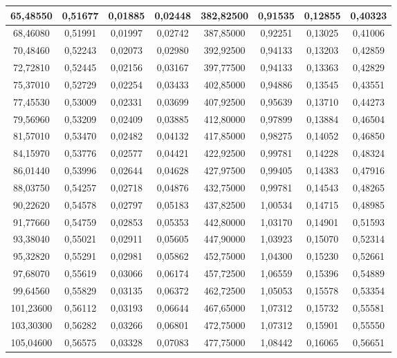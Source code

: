\documentclass[a4paper,12pt]{article}
\numberwithin{equation}{section}
\begin{document}
\begin{appendices}
\begin{longtable}[c]{|c|c|c|c|c|c|c|c|}
65,48550	&	0,51677	&	0,01885	&	0,02448	&	382,82500	&	0,91535	&	0,12855	&	0,40323	\\\hline
68,46080	&	0,51991	&	0,01997	&	0,02742	&	387,85000	&	0,92251	&	0,13025	&	0,41006	\\\hline
70,48460	&	0,52243	&	0,02073	&	0,02980	&	392,92500	&	0,94133	&	0,13203	&	0,42859	\\\hline
72,72810	&	0,52445	&	0,02156	&	0,03167	&	397,77500	&	0,94133	&	0,13363	&	0,42829	\\\hline
75,37010	&	0,52729	&	0,02254	&	0,03433	&	402,85000	&	0,94886	&	0,13545	&	0,43551	\\\hline
77,45530	&	0,53009	&	0,02331	&	0,03699	&	407,92500	&	0,95639	&	0,13710	&	0,44273	\\\hline
79,56960	&	0,53209	&	0,02409	&	0,03885	&	412,80000	&	0,97899	&	0,13884	&	0,46504	\\\hline
81,57010	&	0,53470	&	0,02482	&	0,04132	&	417,85000	&	0,98275	&	0,14052	&	0,46850	\\\hline
84,15970	&	0,53776	&	0,02577	&	0,04421	&	422,92500	&	0,99781	&	0,14228	&	0,48324	\\\hline
86,01440	&	0,53996	&	0,02644	&	0,04628	&	427,97500	&	0,99405	&	0,14383	&	0,47916	\\\hline
88,03750	&	0,54257	&	0,02718	&	0,04876	&	432,75000	&	0,99781	&	0,14543	&	0,48265	\\\hline
90,22620	&	0,54578	&	0,02797	&	0,05183	&	437,82500	&	1,00534	&	0,14715	&	0,48985	\\\hline
91,77660	&	0,54759	&	0,02853	&	0,05353	&	442,80000	&	1,03170	&	0,14901	&	0,51593	\\\hline
93,38040	&	0,55021	&	0,02911	&	0,05605	&	447,90000	&	1,03923	&	0,15070	&	0,52314	\\\hline
95,32820	&	0,55291	&	0,02981	&	0,05862	&	452,75000	&	1,04300	&	0,15230	&	0,52661	\\\hline
97,68070	&	0,55619	&	0,03066	&	0,06174	&	457,72500	&	1,06559	&	0,15396	&	0,54889	\\\hline
99,64560	&	0,55829	&	0,03135	&	0,06372	&	462,72500	&	1,05053	&	0,15578	&	0,53354	\\\hline
101,23600	&	0,56112	&	0,03193	&	0,06644	&	467,65000	&	1,07312	&	0,15732	&	0,55581	\\\hline
103,30300	&	0,56282	&	0,03266	&	0,06801	&	472,75000	&	1,07312	&	0,15901	&	0,55550	\\\hline
105,04600	&	0,56575	&	0,03328	&	0,07083	&	477,75000	&	1,08442	&	0,16065	&	0,56651	\\\hline

\end{longtable}
\end{appendices}
\end{document}
